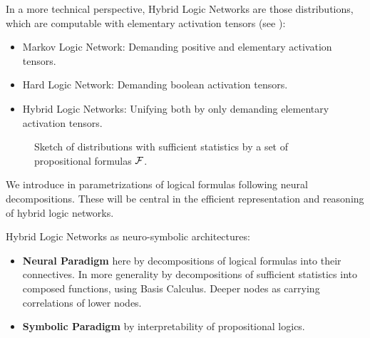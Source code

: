In a more technical perspective, Hybrid Logic Networks are those distributions, which are computable with elementary activation tensors (see ):
\begin{itemize}
    \item Markov Logic Network: Demanding positive and elementary activation tensors.
    \item Hard Logic Network: Demanding boolean activation tensors.
    \item Hybrid Logic Networks: Unifying both by only demanding elementary activation tensors.
\end{itemize}

\begin{figure}[h]
    \begin{center}
        
    \end{center}
    \caption{Sketch of distributions with sufficient statistics by a set of propositional formulas $\mathcal{F}$.}
    \label{fig:elementaryComputableSketch}
\end{figure}



We introduce in  parametrizations of logical formulas following neural decompositions.
These will be central in the efficient representation and reasoning of hybrid logic networks.

Hybrid Logic Networks as neuro-symbolic architectures:
\begin{itemize}
    \item \textbf{Neural Paradigm} here by decompositions of logical formulas into their connectives.
    In more generality by decompositions of sufficient statistics into composed functions, using Basis Calculus.
    Deeper nodes as carrying correlations of lower nodes.
    \item \textbf{Symbolic Paradigm} by interpretability of propositional logics.
\end{itemize}



